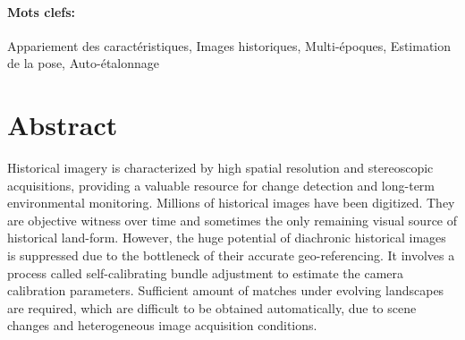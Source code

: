\documentclass[a4paper,11pt,twoside]{ThesisStyle}
\begin{document}
\paragraph{Mots clefs:} Appariement des caractéristiques, Images historiques, Multi-époques, Estimation de la pose, Auto-étalonnage

\cleardoublepage

\section*{Abstract}
Historical imagery is characterized by high spatial resolution and stereoscopic acquisitions, providing a valuable resource for change detection and long-term environmental monitoring. Millions of historical images have been digitized. They are objective witness over time and sometimes the only remaining visual source of historical land-form. However, the huge potential of diachronic historical images is suppressed due to the bottleneck of their accurate geo-referencing.
It involves a process called self-calibrating bundle adjustment to estimate the camera calibration parameters. Sufficient amount of matches under evolving landscapes are required, which are difficult to be obtained automatically, due to scene changes and heterogeneous image acquisition conditions.\\
\end{document}
